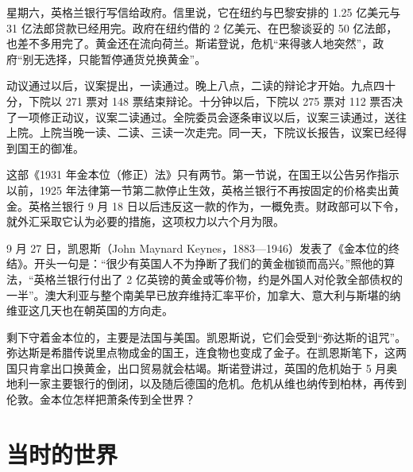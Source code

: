 星期六，英格兰银行写信给政府\cite{hansard1931}。信里说，它在纽约与巴黎安排的 1.25 亿美元与 31 亿法郎贷款已经用完\cite{hansard1931}。政府在纽约借的 2 亿美元、在巴黎谈妥的 50 亿法郎，也差不多用完了\cite{hansard1931}。黄金还在流向荷兰\cite{hansard1931}。斯诺登说，危机“来得骇人地突然”，政府“别无选择，只能暂停通货兑换黄金”\cite{hansard1931}。

动议通过以后，议案提出，一读通过\cite{hansard1931}。晚上八点，二读的辩论才开始\cite{hansard1931}。九点四十分，下院以 271 票对 148 票结束辩论\cite{hansard1931}。十分钟以后，下院以 275 票对 112 票否决了一项修正动议，议案二读通过\cite{hansard1931}。全院委员会逐条审议以后，议案三读通过，送往上院\cite{hansard1931}。上院当晚一读、二读、三读一次走完\cite{hansardlords1931}。同一天，下院议长报告，议案已经得到国王的御准\cite{hansard1931}。

这部《1931 年金本位（修正）法》只有两节\cite{gsa1931}。第一节说，在国王以公告另作指示以前，1925 年法律第一节第二款停止生效，英格兰银行不再按固定的价格卖出黄金\cite{gsa1931}。英格兰银行 9 月 18 日以后违反这一款的作为，一概免责\cite{gsa1931}。财政部可以下令，就外汇采取它认为必要的措施，这项权力以六个月为限\cite{gsa1931}。

9 月 27 日，凯恩斯（John Maynard Keynes，1883—1946）发表了《金本位的终结》\cite{keynes1931,keyneslife2026}。开头一句是：“很少有英国人不为挣断了我们的黄金枷锁而高兴。”\cite{keynes1931}照他的算法，“英格兰银行付出了 2 亿英镑的黄金或等价物，约是外国人对伦敦全部债权的一半”\cite{keynes1931}。澳大利亚与整个南美早已放弃维持汇率平价，加拿大、意大利与斯堪的纳维亚这几天也在朝英国的方向走\cite{keynes1931}。

剩下守着金本位的，主要是法国与美国\cite{keynes1931}。凯恩斯说，它们会受到“弥达斯的诅咒”\cite{keynes1931}。弥达斯是希腊传说里点物成金的国王，连食物也变成了金子。在凯恩斯笔下，这两国只肯拿出口换黄金，出口贸易就会枯竭\cite{keynes1931}。斯诺登讲过，英国的危机始于 5 月奥地利一家主要银行的倒闭，以及随后德国的危机\cite{hansard1931}。危机从维也纳传到柏林，再传到伦敦。金本位怎样把萧条传到全世界？

\section{当时的世界}\label{sec:depressionworld-world}


